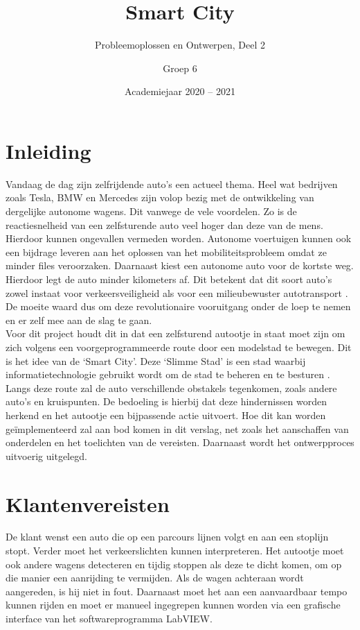 \documentclass[a4paper,twoside,kulak]{kulakreport} %
\title{Smart City}
\subtitle{Probleemoplossen en Ontwerpen, Deel 2}
\author{Groep 6}
\institute {Aaron Vandenberghe, Dieter Demuynck, Jolien Barbier\\  
	Mathis Bossuyt, Rani Jans en Sarah De Meester \\~\\ 
	o.l.v. Benjamin Maveau, Kevin Truyaert en Martijn Boussé}
\date{Academiejaar 2020 -- 2021}
\begin{document}

\titlepage 
\tableofcontents
\renewcommand\thesection{\arabic{section}}
\renewcommand\thesubsection{\thesection.\arabic{subsection}}
\newpage
\section*{Inleiding}\label{Inleiding}
Vandaag de dag zijn zelfrijdende auto's een actueel thema. Heel wat bedrijven zoals Tesla, BMW en Mercedes zijn volop bezig met de ontwikkeling van dergelijke autonome wagens. Dit vanwege de vele voordelen. Zo is de reactiesnelheid van een zelfsturende auto veel hoger dan deze van de mens. Hierdoor kunnen ongevallen vermeden worden. Autonome voertuigen kunnen ook een bijdrage leveren aan het oplossen van het mobiliteitsprobleem omdat ze minder files veroorzaken. Daarnaast kiest een autonome auto voor de kortste weg. Hierdoor legt de auto minder kilometers af. Dit betekent dat dit soort auto's zowel instaat voor verkeersveiligheid als voor een milieubewuster autotransport \cite{AutonomeAutos1, AutonomeAutos2}. De moeite waard dus om deze revolutionaire vooruitgang onder de loep te nemen en er zelf mee aan de slag te gaan.\\
Voor dit project houdt dit in dat een zelfsturend autootje in staat moet zijn om zich volgens een voorgeprogrammeerde route door een modelstad te bewegen. Dit is het idee van de `Smart City'. Deze `Slimme Stad' is een stad waarbij informatietechnologie gebruikt wordt om de stad te beheren en te besturen \cite{SmartCity}. Langs deze route zal de auto verschillende obstakels tegenkomen, zoals andere auto's en kruispunten. De bedoeling is hierbij dat deze hindernissen worden herkend en het autootje een bijpassende actie uitvoert. Hoe dit kan worden geïmplementeerd zal aan bod komen in dit verslag, net zoals het aanschaffen van onderdelen en het toelichten van de vereisten. Daarnaast wordt het ontwerpproces uitvoerig uitgelegd. 


\section{Klantenvereisten} \label{Klantenvereisten}
De klant wenst een auto die op een parcours lijnen volgt en aan een stoplijn stopt. Verder moet het verkeerslichten kunnen interpreteren. Het autootje moet ook andere wagens detecteren en tijdig stoppen als deze te dicht komen, om op die manier een aanrijding te vermijden. Als de wagen achteraan wordt aangereden, is hij niet in fout. Daarnaast moet het aan een aanvaardbaar tempo kunnen rijden en moet er manueel ingegrepen kunnen worden via een grafische interface van het softwareprogramma LabVIEW.
\end{document}
